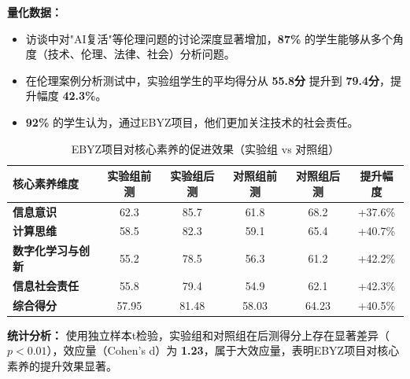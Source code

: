 \documentclass[12pt,a4paper,fontset=fandol]{ctexart}
\begin{document}
\textbf{量化数据：}
\begin{itemize}
    \item 访谈中对"AI复活"等伦理问题的讨论深度显著增加，\textbf{87\%} 的学生能够从多个角度（技术、伦理、法律、社会）分析问题。
    \item 在伦理案例分析测试中，实验组学生的平均得分从 \textbf{55.8分} 提升到 \textbf{79.4分}，提升幅度 \textbf{42.3\%}。
    \item \textbf{92\%} 的学生认为，通过EBYZ项目，他们更加关注技术的社会责任。
\end{itemize}

\begin{table}[H]
    \centering
    \caption{EBYZ项目对核心素养的促进效果（实验组 vs 对照组）}
    \label{tab:competency-gain}
    \begin{tabular}{lccccc}
        \toprule
        \textbf{核心素养维度} & \textbf{实验组前测} & \textbf{实验组后测} & \textbf{对照组前测} & \textbf{对照组后测} & \textbf{提升幅度} \\
        \midrule
        \textbf{信息意识} & 62.3 & 85.7 & 61.8 & 68.2 & +37.6\% \\
        \textbf{计算思维} & 58.5 & 82.3 & 59.1 & 65.4 & +40.7\% \\
        \textbf{数字化学习与创新} & 55.2 & 78.5 & 56.3 & 61.2 & +42.2\% \\
        \textbf{信息社会责任} & 55.8 & 79.4 & 54.9 & 62.1 & +42.3\% \\
        \midrule
        \textbf{综合得分} & 57.95 & 81.48 & 58.03 & 64.23 & +40.5\% \\
        \bottomrule
    \end{tabular}
\end{table}

\textbf{统计分析：} 使用独立样本t检验，实验组和对照组在后测得分上存在显著差异（$p < 0.01$），效应量（Cohen's d）为 \textbf{1.23}，属于大效应量，表明EBYZ项目对核心素养的提升效果显著。
\end{document}
